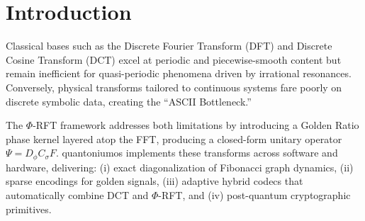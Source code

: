 \documentclass[11pt,a4paper]{article}
\author{Luis M. Minier \\ \textit{Independent Researcher} \\ \href{mailto:luisminier79@gmail.com}{luisminier79@gmail.com}}
\date{December 15, 2025}
\begin{document}
\maketitle

\begin{abstract}
We present the Quantonium Resonance Fourier Transform (RFT) as a reproducible, unitary transform stack centered on deterministic Golden Ratio ($\phi$) structure. A key contribution is a mathematically complete treatment of an irrational-frequency exponential construction at finite transform size $N$: because irrationally spaced exponentials are generally non-orthogonal for finite $N$, correlation inversion is not valid without correction. We therefore introduce Gram-matrix normalization, $\widetilde{\Phi}=\Phi(\Phi^H\Phi)^{-1/2}$, which yields a unitary (Parseval/tight) basis at finite $N$, and we provide dual-frame coefficient extraction as an exact alternative.

We further report empirical validation artifacts from the quantoniumos repository: (i) machine-precision unitarity tests, (ii) finite-$N$ reconstruction benchmarks for frame-corrected and Gram-normalized $\phi$-grid bases, and (iii) large-$N$ (up to $N=4096$) coherence and real-data coefficient diagnostics. Separately, we retain a closed-form $O(N\log N)$ $\phi$-phase FFT operator that is hardware-friendly; the paper distinguishes this fast unitary operator from the irrational-frequency frame-normalized construction.
\end{abstract}

\section{Introduction}

Classical bases such as the Discrete Fourier Transform (DFT) and Discrete Cosine Transform (DCT) excel at periodic and piecewise-smooth content but remain inefficient for quasi-periodic phenomena driven by irrational resonances. Conversely, physical transforms tailored to continuous systems fare poorly on discrete symbolic data, creating the ``ASCII Bottleneck.''

The $\Phi$-RFT framework addresses both limitations by introducing a Golden Ratio phase kernel layered atop the FFT, producing a closed-form unitary operator $\Psi = D_\phi C_\sigma F$. quantoniumos implements these transforms across software and hardware, delivering: (i) exact diagonalization of Fibonacci graph dynamics, (ii) sparse encodings for golden signals, (iii) adaptive hybrid codecs that automatically combine DCT and $\Phi$-RFT, and (iv) post-quantum cryptographic primitives.
\end{document}
